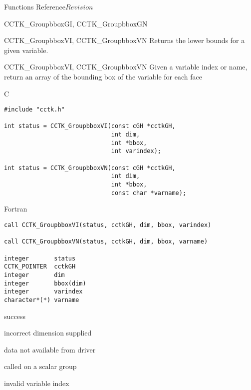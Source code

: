 \begin{cactuspart}{ Functions Reference}{}{$Revision$}
\begin{FunctionDescription}{CCTK\_GroupbboxGI, CCTK\_GroupbboxGN}
\begin{SeeAlsoSection}
\begin{SeeAlso}{CCTK\_GroupbboxVI, CCTK\_GroupbboxVN}
Returns the lower bounds for a given variable.
\end{SeeAlso}
\end{SeeAlsoSection}
\end{FunctionDescription}


\begin{FunctionDescription}{CCTK\_GroupbboxVI, CCTK\_GroupbboxVN}
\label{CCTK-GroupbboxVI}
\label{CCTK-GroupbboxVN}
Given a variable index or name, return an array of the bounding box of the variable for each face

\begin{SynopsisSection}
\begin{Synopsis}{C}
\begin{verbatim}
#include "cctk.h"

int status = CCTK_GroupbboxVI(const cGH *cctkGH,
                              int dim,
                              int *bbox,
                              int varindex);

int status = CCTK_GroupbboxVN(const cGH *cctkGH,
                              int dim,
                              int *bbox,
                              const char *varname);
\end{verbatim}
\end{Synopsis}
\begin{Synopsis}{Fortran}
\begin{verbatim}
call CCTK_GroupbboxVI(status, cctkGH, dim, bbox, varindex)

call CCTK_GroupbboxVN(status, cctkGH, dim, bbox, varname)

integer       status
CCTK_POINTER  cctkGH
integer       dim
integer       bbox(dim)
integer       varindex
character*(*) varname
\end{verbatim}
\end{Synopsis}
\end{SynopsisSection}

\begin{ResultSection}
\begin{Result}{0} success \end{Result}
\begin{Result}{-1} incorrect dimension supplied \end{Result}
\begin{Result}{-2} data not available from driver \end{Result}
\begin{Result}{-3} called on a scalar group \end{Result}
\begin{Result}{-4} invalid variable index \end{Result}
\end{ResultSection}


\end{FunctionDescription}
\end{cactuspart}
